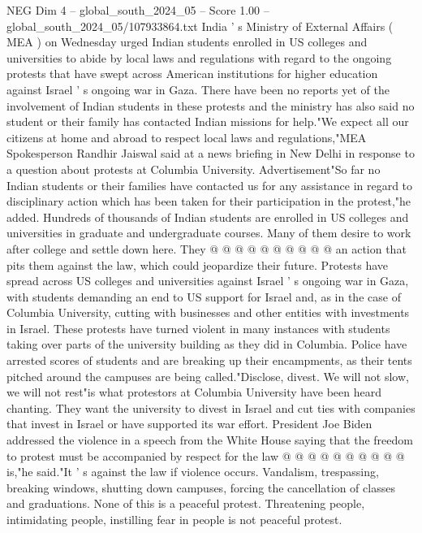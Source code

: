 \begin{textsample}{NEG Dim 4 – global\_south\_2024\_05 – Score 1.00 – global\_south\_2024\_05/107933864.txt}  \label{ex:f4_neg_276}
India ' s Ministry of External Affairs ( MEA ) on Wednesday urged Indian students enrolled in US colleges and universities to abide by local laws and regulations with regard to the ongoing protests that have swept across American institutions for higher education against Israel ' s ongoing war in Gaza.
There have been no reports yet of the involvement of Indian students in these protests and the ministry has also said no student or their family has contacted Indian missions for help."We expect all our citizens at home and abroad to respect local laws and regulations,"MEA Spokesperson Randhir Jaiswal said at a news briefing in New Delhi in response to a question about protests at Columbia University.
Advertisement"So far no Indian students or their families have contacted us for any assistance in regard to disciplinary action which has been taken for their participation in the protest,"he added.
Hundreds of thousands of Indian students are enrolled in US colleges and universities in graduate and undergraduate courses.
Many of them desire to work after college and settle down here.
They @ @ @ @ @ @ @ @ @ @ an action that pits them against the law, which could jeopardize their future.
Protests have spread across US colleges and universities against Israel ' s ongoing war in Gaza, with students demanding an end to US support for Israel and, as in the case of Columbia University, cutting with businesses and other entities with investments in Israel.
These protests have turned violent in many instances with students taking over parts of the university building as they did in Columbia.
Police have arrested scores of students and are breaking up their encampments, as their tents pitched around the campuses are being called."Disclose, divest.
We will not slow, we will not rest"is what protestors at Columbia University have been heard chanting.
They want the university to divest in Israel and cut ties with companies that invest in Israel or have supported its war effort.
President Joe Biden addressed the violence in a speech from the White House saying that the freedom to protest must be accompanied by respect for the law @ @ @ @ @ @ @ @ @ @ is,"he said."It ' s against the law if violence occurs.
Vandalism, trespassing, breaking windows, shutting down campuses, forcing the cancellation of classes and graduations.
None of this is a peaceful protest.
Threatening people, intimidating people, instilling fear in people is not peaceful protest.

\end{textsample}
